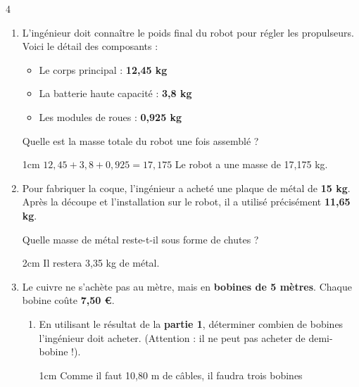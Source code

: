 \documentclass[a4paper]{book}
\begin{document}
{\begin{exerciceNote}{4}
\begin{enumerate}[leftmargin=*]
            \item L'ingénieur doit connaître le poids final du robot pour régler les propulseurs. Voici le détail des composants :
            \begin{itemize}
                \item Le corps principal : \textbf{12,45 kg}
                \item La batterie haute capacité : \textbf{3,8 kg}
                \item Les modules de roues : \textbf{0,925 kg}
            \end{itemize}

            Quelle est la masse totale du robot une fois assemblé ?

            \begin{ZoneReponse}{1cm}
                $12,45+3,8+0,925=17,175$ \hspace{2cm} Le robot a une masse de 17,175 kg.
            \end{ZoneReponse}

            \item Pour fabriquer la coque, l'ingénieur a acheté une plaque de métal de \textbf{15 kg}. Après la découpe et l'installation sur le robot, il a utilisé précisément \textbf{11,65 kg}.
            
            Quelle masse de métal reste-t-il sous forme de chutes ?

            \begin{ZoneReponse}{2cm}
                 \hspace{2cm} Il restera 3,35 kg de métal.
            \end{ZoneReponse}

            \item Le cuivre ne s'achète pas au mètre, mais en \textbf{bobines de 5 mètres}. Chaque bobine coûte \textbf{7,50 €}.
            \begin{enumerate}[leftmargin=*]
                \item En utilisant le résultat de la \textbf{partie 1}, déterminer combien de bobines l'ingénieur doit acheter. (Attention : il ne peut pas acheter de demi-bobine !).
                
                \begin{ZoneReponse}{1cm}
                    Comme il faut 10,80 m de câbles, il faudra trois bobines
                \end{ZoneReponse}
                

\end{enumerate}
\end{enumerate}
\end{exerciceNote}}
\end{document}

